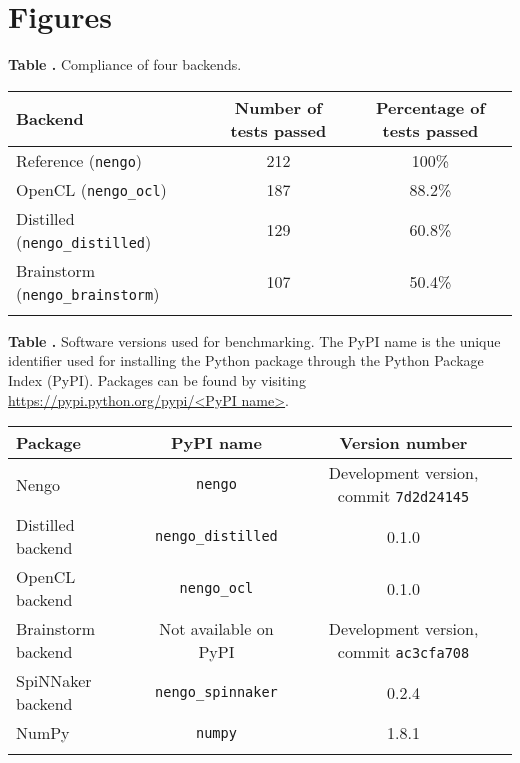 \documentclass{frontiersSCNS}
\begin{document}
\section*{Figures}

\begin{table}[!ht]
\textbf{\label{Tab:01} Table .}{
  Compliance of four backends.}

\processtable{ }
{\begin{tabular}{lcc}\toprule
 Backend & Number of tests passed & Percentage of tests passed\\\midrule
 Reference (\texttt{nengo}) & 212 & 100\% \\
 OpenCL (\texttt{nengo\_ocl}) & 187 & 88.2\% \\
 Distilled (\texttt{nengo\_distilled}) & 129 & 60.8\% \\
 Brainstorm (\texttt{nengo\_brainstorm}) & 107 & 50.4\% \\\botrule
\end{tabular}}{}
\end{table}

\begin{table}[!ht]
\textbf{\label{Tab:02} Table .}{
  Software versions used for benchmarking.
  The PyPI name is the unique identifier used for installing the Python package
  through the Python Package Index (PyPI). Packages can be found by
  visiting \url{https://pypi.python.org/pypi/<PyPI name>}.}

\processtable{ }
{\begin{tabular}{lcc}\toprule
 Package & PyPI name & Version number\\\midrule
 Nengo & \texttt{nengo} & Development version, commit \texttt{7d2d24145} \\
 Distilled backend & \texttt{nengo\_distilled} & 0.1.0 \\
 OpenCL backend & \texttt{nengo\_ocl} & 0.1.0 \\
 Brainstorm backend & Not available on PyPI & Development version, commit \texttt{ac3cfa708} \\
 SpiNNaker backend & \texttt{nengo\_spinnaker} & 0.2.4 \\
 NumPy & \texttt{numpy} & 1.8.1 \\\botrule
\end{tabular}}{}
\end{table}
\end{document}
